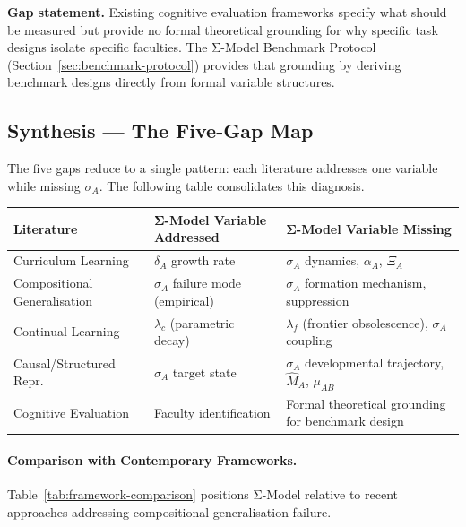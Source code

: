\textbf{Gap statement.} Existing cognitive evaluation frameworks specify
what should be measured but provide no formal theoretical grounding for
why specific task designs isolate specific faculties. The Σ-Model Benchmark
Protocol (Section~\ref{sec:benchmark-protocol}) provides that grounding
by deriving benchmark designs directly from formal variable structures.

\subsection{Synthesis --- The Five-Gap Map}\label{sec:five-gap-map}

The five gaps reduce to a single pattern: each literature addresses
one variable while missing $\sigma_A$. The following table consolidates
this diagnosis.

\begin{center}
\renewcommand{\arraystretch}{1.3}
\begin{tabular}{>{\raggedright}p{3.5cm} >{\raggedright}p{3.5cm} >{\raggedright\arraybackslash}p{6.5cm}}
\toprule
\textbf{Literature} & \textbf{Σ-Model Variable Addressed} & \textbf{Σ-Model Variable Missing} \\
\midrule
Curriculum Learning & $\delta_A$ growth rate & $\sigma_A$ dynamics, $\alpha_A$, $\Xi_A$ \\
Compositional Generalisation & $\sigma_A$ failure mode (empirical) & $\sigma_A$ formation mechanism, suppression \\
Continual Learning & $\lambda_c$ (parametric decay) & $\lambda_f$ (frontier obsolescence), $\sigma_A$ coupling \\
Causal/Structured Repr. & $\sigma_A$ target state & $\sigma_A$ developmental trajectory, $\hat{M}_A$, $\mu_{AB}$ \\
Cognitive Evaluation & Faculty identification & Formal theoretical grounding for benchmark design \\
\bottomrule
\end{tabular}
\end{center}

\paragraph{Comparison with Contemporary Frameworks.}
Table~\ref{tab:framework-comparison} positions Σ-Model relative to recent
approaches addressing compositional generalisation failure.

